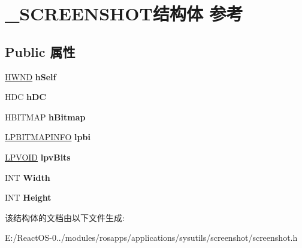 \hypertarget{struct___s_c_r_e_e_n_s_h_o_t}{}\section{\+\_\+\+S\+C\+R\+E\+E\+N\+S\+H\+O\+T结构体 参考}
\label{struct___s_c_r_e_e_n_s_h_o_t}
\subsection*{Public 属性}
\begin{DoxyCompactItemize}
\item 
\mbox{\label{struct___s_c_r_e_e_n_s_h_o_t_a370ff18bfd48db310b89edd42413662b}} 
\hyperlink{interfacevoid}{H\+W\+ND} {\bfseries h\+Self}
\item 
\mbox{\label{struct___s_c_r_e_e_n_s_h_o_t_aaf6bf4803b809a09978abc57f341ba3a}} 
H\+DC {\bfseries h\+DC}
\item 
\mbox{\label{struct___s_c_r_e_e_n_s_h_o_t_a49133322734d7221ff6510938dfb2fff}} 
H\+B\+I\+T\+M\+AP {\bfseries h\+Bitmap}
\item 
\mbox{\label{struct___s_c_r_e_e_n_s_h_o_t_a945438da3429f75cb7e1480310252481}} 
\hyperlink{structtag_b_i_t_m_a_p_i_n_f_o}{L\+P\+B\+I\+T\+M\+A\+P\+I\+N\+FO} {\bfseries lpbi}
\item 
\mbox{\label{struct___s_c_r_e_e_n_s_h_o_t_a387bef6bbc88cc2539f3f5ac0be03bb6}} 
\hyperlink{interfacevoid}{L\+P\+V\+O\+ID} {\bfseries lpv\+Bits}
\item 
\mbox{\label{struct___s_c_r_e_e_n_s_h_o_t_adbff9d27fc526cf59f1bc81cf5b3d1ed}} 
I\+NT {\bfseries Width}
\item 
\mbox{\label{struct___s_c_r_e_e_n_s_h_o_t_aa74605fbb408052d5bbd286f7ec06d49}} 
I\+NT {\bfseries Height}
\end{DoxyCompactItemize}


该结构体的文档由以下文件生成\+:\begin{DoxyCompactItemize}
\item 
E\+:/\+React\+O\+S-\/0../modules/rosapps/applications/sysutils/screenshot/screenshot.\+h\end{DoxyCompactItemize}
